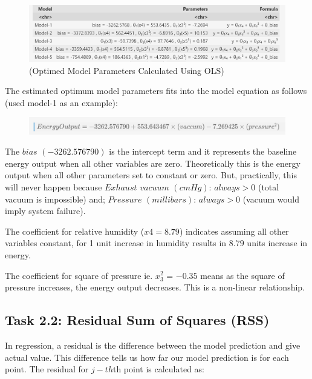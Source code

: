 \documentclass[12pt,a4paper]{article}
\begin{document}
\begin{figure}[H]
  \centering
  \includegraphics[width=\textwidth]{y1.png}
  \caption{(Optimed Model Parameters Calculated Using OLS)}
  \label{fig:Optimized Model Parameters}
\end{figure}

The estimated optimum model parameters fits into the model equation as follows (used model-1 
as an example): 

\begin{figure}[H]
  \centering
  \includegraphics[width=\textwidth]{y2.png}
\end{figure}

The $bias$ $(-3262.576790)$ is the intercept term and it represents the baseline energy output 
when all other variables are zero. Theoretically this is the energy 
output when all other parameters set to constant or zero. But, 
practically, this will never happen because $Exhaust$ $vacuum$ $(cmHg)$: $always  > 0$ 
(total vacuum is impossible) and; 
$Pressure$ $(millibars)$: $always > 0$ (vacuum would imply system failure).

The coefficient for relative humidity ($x4= 8.79$) indicates
assuming all other variables constant, for 1 unit 
increase in humidity results in $8.79$ units
increase in energy.

The coefficient for square of pressure ie. $x_3^2$ = $-0.35$
means as the square of pressure increases, the 
energy output decreases. This is a 
non-linear relationship. 


\subsection*{Task 2.2: Residual Sum of Squares (RSS)}

In regression, a residual is the difference between the model prediction and give actual value.
This difference tells us how far our model prediction is
for each point. The residual for $j-th$th point is calculated as: 
\end{document}
